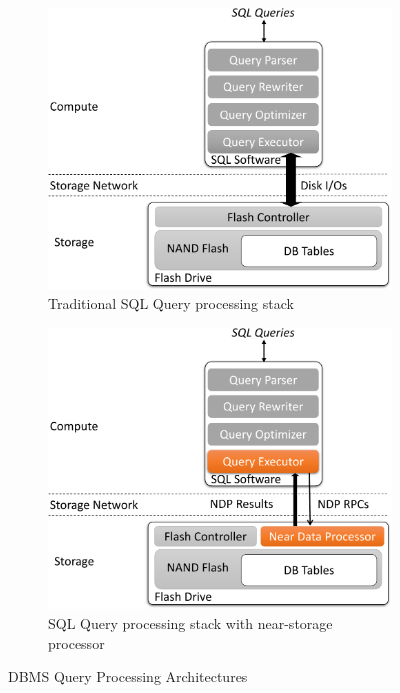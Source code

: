 \documentclass{article}
\begin{document}
\begin{figure}[!htb]
  \centering
    \begin{subfigure}[t]{0.40\textwidth}
      \includegraphics[width=\textwidth]{figures/software-stack-crop.pdf}
      \caption{Traditional SQL Query processing stack}
      \label{fig:software}
  \end{subfigure}\hspace{50pt}
  \begin{subfigure}[t]{0.40\textwidth}
    \includegraphics[width=\textwidth]{figures/accelerator-stack-crop.pdf}
    \caption{SQL Query processing stack with near-storage processor}
    \label{fig:accelerator}
  \end{subfigure}
  \label{fig:try}
  \caption{DBMS Query Processing Architectures}
\end{figure}
\end{document}
